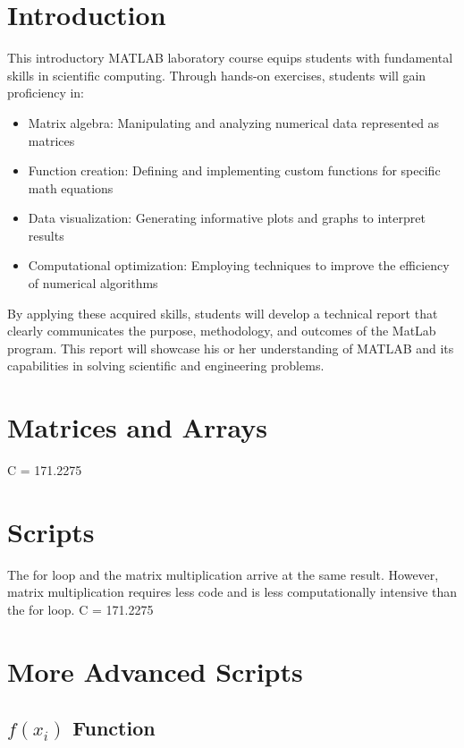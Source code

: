 \documentclass[12pt]{article}
\begin{document}
	\section{Introduction}
		This introductory MATLAB laboratory course equips students with fundamental skills in scientific computing. Through hands-on exercises, students will gain proficiency in:
		\begin{itemize}
			\item Matrix algebra: Manipulating and analyzing numerical data represented as matrices
			\item Function creation: Defining and implementing custom functions for specific math equations
			\item Data visualization: Generating informative plots and graphs to interpret results
			\item Computational optimization: Employing techniques to improve the efficiency of numerical algorithms
		\end{itemize}
		By applying these acquired skills, students will develop a technical report that clearly communicates the purpose, methodology, and outcomes of the MatLab program. This report will showcase his or her understanding of MATLAB and its capabilities in solving scientific and engineering problems.
	\section{Matrices and Arrays}
		
		C = 171.2275
	\section{Scripts}
		
		The for loop and the matrix multiplication arrive at the same result. However, matrix multiplication requires less code and is less computationally intensive than the for loop.
		C = 171.2275
	\section{More Advanced Scripts}
		\subsection{$f(x_{i})$ Function}
			
\end{document}
